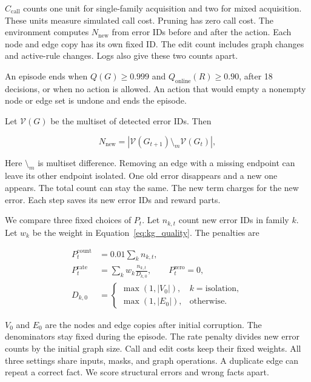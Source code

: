 $C_{\mathrm{call}}$ counts one unit for single-family acquisition and
two for mixed acquisition. These units measure simulated call cost.
Pruning has zero call cost. The environment computes $N_{\mathrm{new}}$
from error IDs before and after the action. Each node and edge copy has
its own fixed ID. The edit count includes graph changes and active-rule
changes. Logs also give these two counts apart.

An episode ends when $Q(G)\geq0.999$ and $Q_{\mathrm{online}}(R)\geq0.90$,
after 18 decisions, or when no action is allowed. An action that would
empty a nonempty node or edge set is undone and ends the episode.

Let $\mathcal V(G)$ be the multiset of detected error IDs. Then

\begin{equation}
N_{\mathrm{new}}=\left|\mathcal V(G_{t+1})\setminus_{\!m}\mathcal V(G_t)\right|,
\end{equation}

Here $\setminus_m$ is multiset difference. Removing an edge with a missing
endpoint can leave its other endpoint isolated. One old error disappears
and a new one appears. The total count can stay the same. The new term
charges for the new error. Each step saves its new error IDs and reward parts.

We compare three fixed choices of $P_t$. Let $n_{k,t}$ count new error IDs
in family $k$. Let $w_k$ be the weight in Equation~\ref{eq:kg_quality}.
The penalties are

\begin{equation}
\label{eq:safety_modes}
\begin{aligned}
P_t^{\mathrm{count}}&=0.01\sum_k n_{k,t},\\
P_t^{\mathrm{rate}}&=\sum_k w_k\frac{n_{k,t}}{D_{k,0}},\qquad
P_t^{\mathrm{zero}}=0,\\
D_{k,0}&=\begin{cases}
\max(1,|V_0|),&k=\text{isolation},\\
\max(1,|E_0|),&\text{otherwise}.
\end{cases}
\end{aligned}
\end{equation}

$V_0$ and $E_0$ are the nodes and edge copies after initial corruption.
The denominators stay fixed during the episode. The rate penalty divides
new error counts by the initial graph size. Call and edit costs keep their
fixed weights. All three settings share inputs, masks, and graph operations.
A duplicate edge can repeat a correct fact. We score structural errors
and wrong facts apart.


